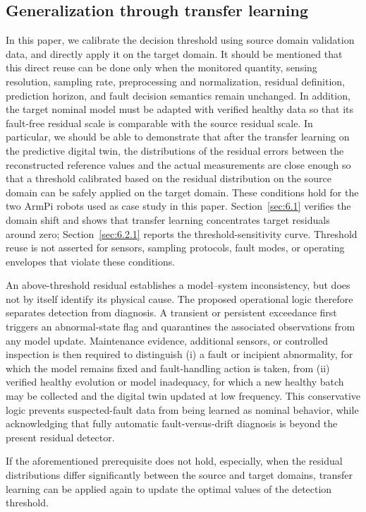 \documentclass[a4paper,10pt]{cas-sc}%
\newenvironment{revision}{\color{revisionred}}{}
\begin{document}
\subsection{Generalization through transfer learning}\label{sec:4.3}

\begin{revision}
	In this paper, we calibrate the decision threshold using source domain validation data, and directly apply it on the target domain. It should be mentioned that this direct reuse can be done only when the monitored quantity, sensing resolution, sampling rate, preprocessing and normalization, residual definition, prediction horizon, and fault decision semantics remain unchanged. In addition, the target nominal model must be adapted with verified healthy data so that its fault-free residual scale is comparable with the source residual scale. In particular, we should be able to demonstrate that after the transfer learning on the predictive digital twin, the distributions of the residual errors between the reconstructed reference values and the actual measurements are close enough so that a threshold calibrated based on the residual distribution on the source domain can be safely applied on the target domain. These conditions hold for the two ArmPi robots used as case study in this paper. Section~\ref{sec:6.1} verifies the domain shift and shows that transfer learning concentrates target residuals around zero; Section~\ref{sec:6.2.1} reports the threshold-sensitivity curve. Threshold reuse is not asserted for sensors, sampling protocols, fault modes, or operating envelopes that violate these conditions.

	An above-threshold residual establishes a model--system inconsistency, but does not by itself identify its physical cause. The proposed operational logic therefore separates detection from diagnosis. A transient or persistent exceedance first triggers an abnormal-state flag and quarantines the associated observations from any model update. Maintenance evidence, additional sensors, or controlled inspection is then required to distinguish (i) a fault or incipient abnormality, for which the model remains fixed and fault-handling action is taken, from (ii) verified healthy evolution or model inadequacy, for which a new healthy batch may be collected and the digital twin updated at low frequency. This conservative logic prevents suspected-fault data from being learned as nominal behavior, while acknowledging that fully automatic fault-versus-drift diagnosis is beyond the present residual detector.

	If the aforementioned prerequisite does not hold, especially, when the residual distributions differ significantly between the source and target domains, transfer learning can be applied again to update the optimal values of the detection threshold.
\end{revision}
\end{document}
